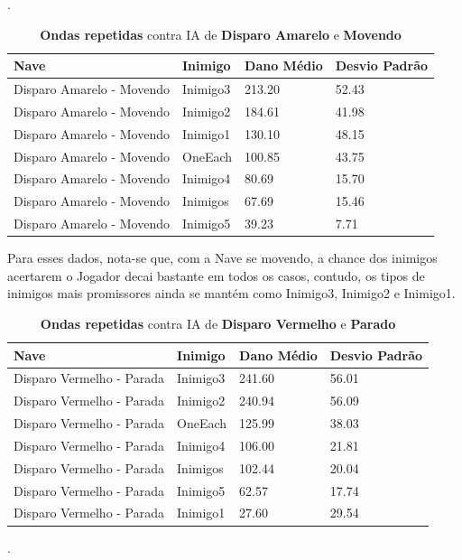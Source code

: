 \begin{table}
\centering
\caption{\textbf{Ondas repetidas} contra IA de \textbf{Disparo Amarelo} e \textbf{Movendo}}.
\begin{tabular}{l|l|ll}
Nave                      & Inimigo  & Dano Médio & Desvio Padrão \\ \hline
Disparo Amarelo - Movendo & Inimigo3 & 213.20     & 52.43         \\
Disparo Amarelo - Movendo & Inimigo2 & 184.61     & 41.98         \\
Disparo Amarelo - Movendo & Inimigo1 & 130.10     & 48.15         \\
Disparo Amarelo - Movendo & OneEach  & 100.85     & 43.75         \\
Disparo Amarelo - Movendo & Inimigo4 & 80.69      & 15.70         \\
Disparo Amarelo - Movendo & Inimigos & 67.69      & 15.46         \\
Disparo Amarelo - Movendo & Inimigo5 & 39.23      & 7.71         
\end{tabular}
\label{tab:ss-yellow-move}
\end{table}

Para esses dados, nota-se que, com a Nave se movendo, a chance dos inimigos acertarem o Jogador decai bastante em todos os casos, contudo, os tipos de inimigos mais promissores ainda se mantém como Inimigo3, Inimigo2 e Inimigo1.

\pagebreak

\begin{table}
\centering
\begin{tabular}{l|l|ll}
Nave                      & Inimigo  & Dano Médio & Desvio Padrão \\ \hline
Disparo Vermelho - Parada & Inimigo3 & 241.60     & 56.01         \\
Disparo Vermelho - Parada & Inimigo2 & 240.94     & 56.09         \\
Disparo Vermelho - Parada & OneEach  & 125.99     & 38.03         \\
Disparo Vermelho - Parada & Inimigo4 & 106.00     & 21.81         \\
Disparo Vermelho - Parada & Inimigos & 102.44     & 20.04         \\
Disparo Vermelho - Parada & Inimigo5 & 62.57      & 17.74         \\
Disparo Vermelho - Parada & Inimigo1 & 27.60      & 29.54        
\end{tabular}
\caption{\textbf{Ondas repetidas} contra IA de \textbf{Disparo Vermelho} e \textbf{Parado} \label{tab:ss-red-still}}.
\end{table}

